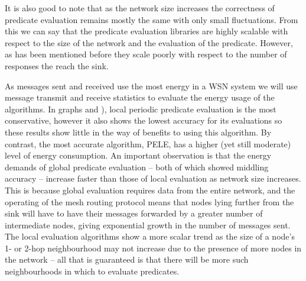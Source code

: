 It is also good to note that as the network size increases the correctness of predicate evaluation remains mostly the same with only small fluctuations. From this we can say that the predicate evaluation libraries are highly scalable with respect to the size of the network and the evaluation of the predicate. However, as has been mentioned before they scale poorly with respect to the number of responses the reach the sink.

As messages sent and received use the most energy in a WSN system \cite{Shnayder04} we will use message transmit and receive statistics to evaluate the energy usage of the algorithms. In graphs  and  ), local periodic predicate evaluation is the most conservative, however it also shows the lowest accuracy for its evaluations so these results show little in the way of benefits to using this algorithm. By contrast, the most accurate algorithm, PELE, has a higher (yet still moderate) level of energy consumption. An important observation is that the energy demands of global predicate evaluation -- both of which showed middling accuracy -- increase faster than those of local evaluation as network size increases. This is because global evaluation requires data from the entire network, and the operating of the mesh routing protocol means that nodes lying further from the sink will have to have their messages forwarded by a greater number of intermediate nodes, giving exponential growth in the number of messages sent. The local evaluation algorithms show a more scalar trend as the size of a node's 1- or 2-hop neighbourhood may not increase due to the presence of more nodes in the network -- all that is guaranteed is that there will be more such neighbourhoods in which to evaluate predicates.

